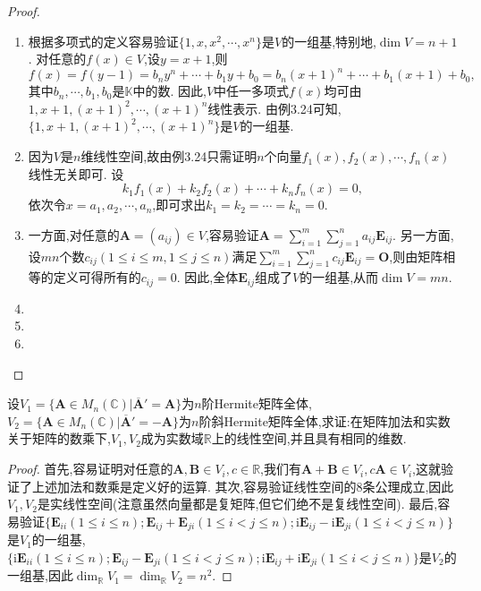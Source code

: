 \documentclass[../../main.tex]{subfiles}%
\begin{document}
\begin{proof}
\begin{enumerate}[(1)]
\item 根据多项式的定义容易验证\(\{1,x,x^2,\cdots,x^n\}\)是\(V\)的一组基,特别地,\(\dim V=n + 1\). 对任意的\(f(x)\in V\),设\(y=x + 1\),则
\[
f(x)=f(y - 1)=b_ny^n+\cdots+b_1y + b_0=b_n(x + 1)^n+\cdots+b_1(x + 1)+b_0,
\]
其中\(b_n,\cdots,b_1,b_0\)是\(\mathbb{K}\)中的数. 因此,\(V\)中任一多项式\(f(x)\)均可由\(1,x + 1,(x + 1)^2,\cdots,(x + 1)^n\)线性表示. 由例3.24可知,\(\{1,x + 1,(x + 1)^2,\cdots,(x + 1)^n\}\)是\(V\)的一组基.
\item 因为\(V\)是\(n\)维线性空间,故由例3.24只需证明\(n\)个向量\(f_1(x),f_2(x),\cdots,f_n(x)\)线性无关即可. 设
\[
k_1f_1(x)+k_2f_2(x)+\cdots+k_nf_n(x)=0,
\]
依次令\(x = a_1,a_2,\cdots,a_n\),即可求出\(k_1 = k_2=\cdots=k_n = 0\). 
\item 一方面,对任意的\(\boldsymbol{A}=(a_{ij})\in V\),容易验证\(\boldsymbol{A}=\sum_{i = 1}^{m}\sum_{j = 1}^{n}a_{ij}\boldsymbol{E}_{ij}\). 另一方面,设\(mn\)个数\(c_{ij}(1\leqslant  i\leqslant  m,1\leqslant  j\leqslant  n)\)满足\(\sum_{i = 1}^{m}\sum_{j = 1}^{n}c_{ij}\boldsymbol{E}_{ij}=\boldsymbol{O}\),则由矩阵相等的定义可得所有的\(c_{ij}=0\). 因此,全体\(\boldsymbol{E}_{ij}\)组成了\(V\)的一组基,从而\(\dim V = mn\).
\item 
\item 
\item 
\end{enumerate}
\end{proof}

\begin{example}[$\,\,$\(n\)阶(斜)Hermite矩阵全体构成的线性空间]\label{example:n阶(斜)Hermite矩阵全体构成的线性空间}

设\(V_1 = \{ \boldsymbol{A} \in M_n(\mathbb{C})|\overline{\boldsymbol{A}}'=\boldsymbol{A}\}\)为\(n\)阶Hermite矩阵全体,\(V_2 = \{ \boldsymbol{A} \in M_n(\mathbb{C})|\overline{\boldsymbol{A}}'=-\boldsymbol{A}\}\)为\(n\)阶斜Hermite矩阵全体,求证:在矩阵加法和实数关于矩阵的数乘下,\(V_1,V_2\)成为实数域\(\mathbb{R}\)上的线性空间,并且具有相同的维数.
\end{example}
\begin{proof}
首先,容易证明对任意的\(\boldsymbol{A},\boldsymbol{B} \in V_i,c \in \mathbb{R}\),我们有\(\boldsymbol{A}+\boldsymbol{B} \in V_i,c\boldsymbol{A} \in V_i\),这就验证了上述加法和数乘是定义好的运算. 其次,容易验证线性空间的8条公理成立,因此\(V_1,V_2\)是实线性空间(注意虽然向量都是复矩阵,但它们绝不是复线性空间). 最后,容易验证\(\{\boldsymbol{E}_{ii}(1\leqslant  i\leqslant  n);\boldsymbol{E}_{ij}+\boldsymbol{E}_{ji}(1\leqslant  i< j\leqslant  n);\mathrm{i}\boldsymbol{E}_{ij}-\mathrm{i}\boldsymbol{E}_{ji}(1\leqslant  i< j\leqslant  n)\}\)是\(V_1\)的一组基,\(\{\mathrm{i}\boldsymbol{E}_{ii}(1\leqslant  i\leqslant  n);\boldsymbol{E}_{ij}-\boldsymbol{E}_{ji}(1\leqslant  i< j\leqslant  n);\mathrm{i}\boldsymbol{E}_{ij}+\mathrm{i}\boldsymbol{E}_{ji}(1\leqslant  i< j\leqslant  n)\}\)是\(V_2\)的一组基,因此\(\dim_{\mathbb{R}}V_1=\dim_{\mathbb{R}}V_2=n^2\).
\end{proof}
\end{document}
